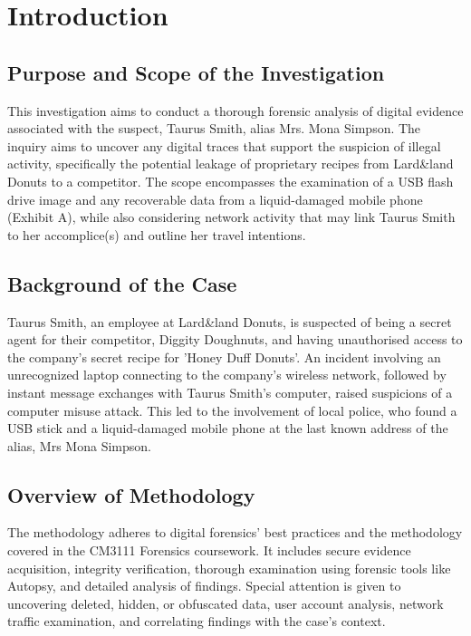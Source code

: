 \chapter{Introduction}

\section{Purpose and Scope of the Investigation}
This investigation aims to conduct a thorough forensic analysis of digital evidence associated with the suspect, Taurus Smith, alias Mrs. Mona Simpson. The inquiry aims to uncover any digital traces that support the suspicion of illegal activity, specifically the potential leakage of proprietary recipes from Lard\&land Donuts to a competitor. The scope encompasses the examination of a USB flash drive image and any recoverable data from a liquid-damaged mobile phone (Exhibit A), while also considering network activity that may link Taurus Smith to her accomplice(s) and outline her travel intentions.

\section{Background of the Case}
Taurus Smith, an employee at Lard\&land Donuts, is suspected of being a secret agent for their competitor, Diggity Doughnuts, and having unauthorised access to the company's secret recipe for 'Honey Duff Donuts'. An incident involving an unrecognized laptop connecting to the company's wireless network, followed by instant message exchanges with Taurus Smith's computer, raised suspicions of a computer misuse attack. This led to the involvement of local police, who found a USB stick and a liquid-damaged mobile phone at the last known address of the alias, Mrs Mona Simpson.

\section{Overview of Methodology}
The methodology adheres to digital forensics' best practices and the methodology covered in the CM3111 Forensics coursework. It includes secure evidence acquisition, integrity verification, thorough examination using forensic tools like Autopsy, and detailed analysis of findings. Special attention is given to uncovering deleted, hidden, or obfuscated data, user account analysis, network traffic examination, and correlating findings with the case's context.

